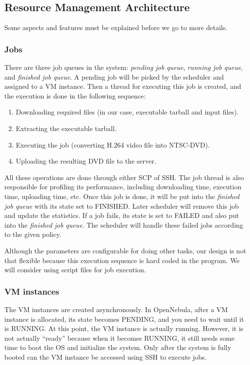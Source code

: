 \subsection{Resource Management Architecture}
Some aspects and features must be explained before we go to more details.

\subsubsection{Jobs}
There are three job queues in the system: \emph{pending job queue}, \emph{running job queue}, and \emph{finished job queue}. A pending job will be picked by the scheduler and assigned to a VM instance. Then a thread for executing this job is created, and the execution is done in the following sequence:

\begin{enumerate}
\item Downloading required files (in our case, executable tarball and input files).
\item Extracting the executable tarball.
\item Executing the job (converting H.264 video file into NTSC-DVD).
\item Uploading the resulting DVD file to the server.
\end{enumerate}

All these operations are done through either SCP of SSH. The job thread is also responsible for profiling its performance, including downloading time, execution time, uploading time, etc. Once this job is done, it will be put into the \emph{finished job queue} with its state set to FINISHED. Later scheduler will remove this job and update the statistics. If a job fails, its state is set to FAILED and also put into the \emph{finished job queue}. The scheduler will handle these failed jobs according to the given policy.

Although the parameters are configurable for doing other tasks, our design is not that flexible because this execution sequence is hard coded in the program. We will consider using script files for job execution.


\subsubsection{VM instances}
The VM instances are created asynchronously. In OpenNebula, after a VM instance is allocated, its state becomes PENDING, and you need to wait until it is RUNNING. At this point, the VM instance is actually running. However, it is not actually ``ready'' because when it becomes RUNNING, it still needs some time to boot the OS and initialize the system. Only after the system is fully booted can the VM instance be accessed using SSH to execute jobs.

